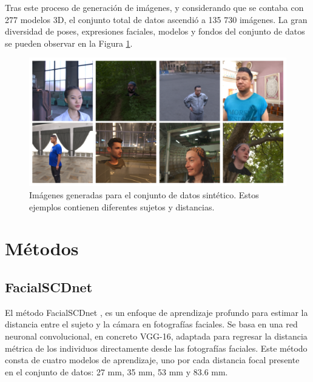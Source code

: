 Tras este proceso de generación de imágenes, y considerando que se contaba con 277 modelos 3D, el conjunto total de datos ascendió a 135 730 imágenes. La gran diversidad de poses, expresiones faciales, modelos y fondos del conjunto de datos se pueden observar en la Figura \ref{fig24}.


\begin{figure}[h]
	\centering
	\includegraphics[scale=0.4]{imagenes/cap4/ejemplos_dataset.png}
	\caption[Ejemplos de imágenes generadas para el conjunto de datos.]{Imágenes generadas para el conjunto de datos sintético. Estos ejemplos contienen diferentes sujetos y distancias.}
	\label{fig24}
\end{figure}

\section{Métodos}

\subsection{FacialSCDnet}\label{fscdnet}

El método FacialSCDnet \cite{14}, es un enfoque de aprendizaje profundo para estimar la distancia entre el sujeto y la cámara en fotografías faciales. Se basa en una red neuronal convolucional, en concreto VGG-16, adaptada para regresar la distancia métrica de los individuos directamente desde las fotografías faciales. Este método consta de cuatro modelos de aprendizaje, uno por cada distancia focal presente en el conjunto de datos: 27 mm, 35 mm, 53 mm y 83.6 mm.
\newline 

